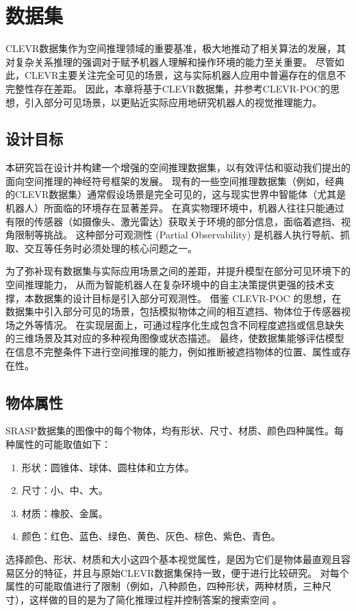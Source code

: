 \chapter{数据集}
CLEVR数据集作为空间推理领域的重要基准，极大地推动了相关算法的发展，其对复杂关系推理的强调对于赋予机器人理解和操作环境的能力至关重要。
尽管如此，CLEVR主要关注完全可见的场景，这与实际机器人应用中普遍存在的信息不完整性存在差距。
因此，本章将基于CLEVR数据集，并参考CLEVR-POC的思想，引入部分可见场景，以更贴近实际应用地研究机器人的视觉推理能力。

\section{设计目标}
本研究旨在设计并构建一个增强的空间推理数据集，以有效评估和驱动我们提出的面向空间推理的神经符号框架的发展。
现有的一些空间推理数据集（例如，经典的CLEVR数据集）通常假设场景是完全可见的，这与现实世界中智能体（尤其是机器人）所面临的环境存在显著差异。
在真实物理环境中，机器人往往只能通过有限的传感器（如摄像头、激光雷达）获取关于环境的部分信息，面临着遮挡、视角限制等挑战。
这种部分可观测性 (Partial Observability) 是机器人执行导航、抓取、交互等任务时必须处理的核心问题之一。

为了弥补现有数据集与实际应用场景之间的差距，并提升模型在部分可见环境下的空间推理能力，
从而为智能机器人在复杂环境中的自主决策提供更强的技术支撑，本数据集的设计目标是引入部分可观测性。
借鉴 CLEVR-POC 的思想，在数据集中引入部分可见的场景，包括模拟物体之间的相互遮挡、物体位于传感器视场之外等情况。
在实现层面上，可通过程序化生成包含不同程度遮挡或信息缺失的三维场景及其对应的多种视角图像或状态描述。
最终，使数据集能够评估模型在信息不完整条件下进行空间推理的能力，例如推断被遮挡物体的位置、属性或存在性。

\section{物体属性}
SRASP数据集的图像中的每个物体，均有形状、尺寸、材质、颜色四种属性。每种属性的可能取值如下：
\begin{enumerate}[label=(\arabic*),itemsep=0pt,parsep=0pt]
    \item 形状：圆锥体、球体、圆柱体和立方体。
    \item 尺寸：小、中、大。
    \item 材质：橡胶、金属。
    \item 颜色：红色、蓝色、绿色、黄色、灰色、棕色、紫色、青色。
\end{enumerate}

选择颜色、形状、材质和大小这四个基本视觉属性，是因为它们是物体最直观且容易区分的特征，并且与原始CLEVR数据集保持一致，便于进行比较研究。
对每个属性的可能取值进行了限制（例如，八种颜色，四种形状，两种材质，三种尺寸），这样做的目的是为了简化推理过程并控制答案的搜索空间 。

